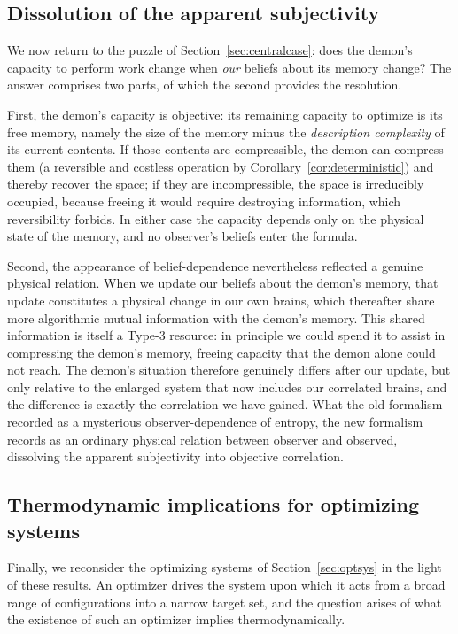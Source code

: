 \documentclass[11pt]{article}
\begin{document}
\subsection{Dissolution of the apparent subjectivity}
\label{sec:dissolve}

We now return to the puzzle of Section~\ref{sec:centralcase}: does the demon's capacity to perform work change when \emph{our} beliefs about its memory change? The answer comprises two parts, of which the second provides the resolution.

First, the demon's capacity is objective: its remaining capacity to optimize is its free memory, namely the size of the memory minus the \emph{description complexity} of its current contents. If those contents are compressible, the demon can compress them (a reversible and costless operation by Corollary~\ref{cor:deterministic}) and thereby recover the space; if they are incompressible, the space is irreducibly occupied, because freeing it would require destroying information, which reversibility forbids. In either case the capacity depends only on the physical state of the memory, and no observer's beliefs enter the formula.

Second, the appearance of belief-dependence nevertheless reflected a genuine physical relation. When we update our beliefs about the demon's memory, that update constitutes a physical change in our own brains, which thereafter share more algorithmic mutual information with the demon's memory. This shared information is itself a Type-3 resource: in principle we could spend it to assist in compressing the demon's memory, freeing capacity that the demon alone could not reach. The demon's situation therefore genuinely differs after our update, but only relative to the enlarged system that now includes our correlated brains, and the difference is exactly the correlation we have gained. What the old formalism recorded as a mysterious observer-dependence of entropy, the new formalism records as an ordinary physical relation between observer and observed, dissolving the apparent subjectivity into objective correlation.

\subsection{Thermodynamic implications for optimizing systems}
\label{sec:backtoflint}

Finally, we reconsider the optimizing systems of Section~\ref{sec:optsys} in the light of these results. An optimizer drives the system upon which it acts from a broad range of configurations into a narrow target set, and the question arises of what the existence of such an optimizer implies thermodynamically.
\end{document}
